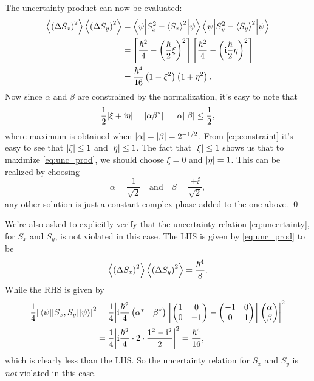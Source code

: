 \documentclass[11pt,letter, swedish, english
]{article}
\begin{document}
The uncertainty product can now be evaluated:
\begin{equation} \label{eq:unc_prod}
\begin{aligned}
\ev{\left(\Delta{S_x}\right)^2}\ev{\left(\Delta{S_y}\right)^2}
&= \ev**{S_x^2-\ev{S_x}^2}{\psi}\ev**{S_y^2-\ev{S_y}^2}{\psi} \\
&= \left[\frac{\hbar^2}{4}-\left(\frac{\hbar}{2}\xi\right)^2\right]
   \left[\frac{\hbar^2}{4}-\left(\ii\frac{\hbar}{2}\eta\right)^2\right]\\
&= \frac{\hbar^4}{16}\left(1 - \xi^2\right)\left(1 + \eta^2\right).
\end{aligned}
\end{equation}
Now since $\alpha$ and $\beta$ are constrained by the normalization,
it's easy to note that
\begin{equation} \label{eq:constraint}
\frac{1}{2}\abs{\xi+\mathrm{i}\eta} = \abs{\alpha\beta^*}=\abs{\alpha}\abs{\beta}\le\frac{1}{2},
\end{equation}
where maximum is obtained when $\abs{\alpha}=\abs{\beta}=2^{-1/2}$.
From \eqref{eq:constraint} it's easy to see that $\abs{\xi}\le1$ and
$\abs{\eta}\le1$. The fact that $\abs{\xi}\le1$ shows us that to
maximize \eqref{eq:unc_prod}, we should choose $\xi=0$ and
$\abs{\eta}=1$. This can be realized by choosing
\begin{equation}
\alpha=\frac{1}{\sqrt{2}}\quad\text{and}\quad\beta=\frac{\pm\ii}{\sqrt{2}},
\end{equation}
any other solution is just a constant complex phase added to the one
above. \qed

We're also asked to explicitly verify that the uncertainty relation
\eqref{eq:uncertainty}, for $S_x$ and $S_y$, is not violated in this
case. The LHS is given by \eqref{eq:unc_prod} to be
\begin{equation}
\ev{\left(\Delta{S_x}\right)^2}\ev{\left(\Delta{S_y}\right)^2}
= \frac{\hbar^4}{8}.
\end{equation}
While the RHS is given by
\begin{equation}
\begin{aligned}
\frac{1}{4}\abs{\ev{\comm{S_x}{S_y}}{\psi}}^2
&= \frac{1}{4} \abs{
   \ii\frac{\hbar^2}{4}
   \begin{pmatrix}\alpha^*&\beta^*\end{pmatrix}
   \left[
     \begin{pmatrix}1&0\\0&-1\end{pmatrix}-\begin{pmatrix}-1&0\\0&1\end{pmatrix}
   \right]
   \begin{pmatrix}\alpha\\\beta\end{pmatrix}
 }^2\\
&= \frac{1}{4} \abs{
   \ii\frac{\hbar^2}{4}\cdot2\cdot\frac{1^2-\ii^2}{2}
 }^2= \frac{\hbar^4}{16},
\end{aligned}
\end{equation}
which is clearly less than the LHS. So the uncertainty relation for
$S_x$ and $S_y$ is \emph{not} violated in this case.
\end{document}
